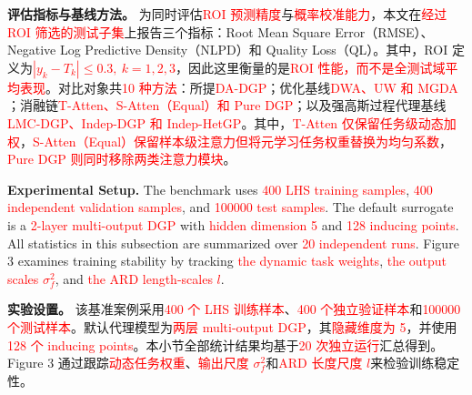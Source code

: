 \documentclass[11pt]{article}
\begin{document}
\textbf{评估指标与基线方法。} 为同时评估\textcolor{red}{ROI 预测精度}与\textcolor{red}{概率校准能力}，本文在\textcolor{red}{经过 ROI 筛选的测试子集}上报告三个指标：Root Mean Square Error（RMSE）、Negative Log Predictive Density（NLPD）和 Quality Loss（QL）。其中，ROI 定义为\textcolor{red}{$|y_k-T_k|\leq 0.3,\ k=1,2,3$}，因此这里衡量的是\textcolor{red}{ROI 性能，而不是全测试域平均表现}。对比对象共\textcolor{red}{10 种方法}：所提\textcolor{red}{DA-DGP}；优化基线\textcolor{red}{DWA、UW 和 MGDA \citep{Liu2019,Kendall2018,Sener2018}}；消融链\textcolor{red}{T-Atten、S-Atten（Equal）和 Pure DGP}；以及强高斯过程代理基线\textcolor{red}{LMC-DGP、Indep-DGP 和 Indep-HetGP}。其中，\textcolor{red}{T-Atten 仅保留任务级动态加权}，\textcolor{red}{S-Atten（Equal）保留样本级注意力但将元学习任务权重替换为均匀系数}，\textcolor{red}{Pure DGP 则同时移除两类注意力模块}。

\textbf{Experimental Setup.} The benchmark uses \textcolor{red}{400 LHS training samples}, \textcolor{red}{400 independent validation samples}, and \textcolor{red}{100000 test samples}. The default surrogate is a \textcolor{red}{2-layer multi-output DGP} with \textcolor{red}{hidden dimension 5} and \textcolor{red}{128 inducing points}. All statistics in this subsection are summarized over \textcolor{red}{20 independent runs}. Figure 3 examines training stability by tracking \textcolor{red}{the dynamic task weights}, \textcolor{red}{the output scales $\sigma_f^2$}, and \textcolor{red}{the ARD length-scales $l$}.

\textbf{实验设置。} 该基准案例采用\textcolor{red}{400 个 LHS 训练样本}、\textcolor{red}{400 个独立验证样本}和\textcolor{red}{100000 个测试样本}。默认代理模型为\textcolor{red}{两层 multi-output DGP}，其\textcolor{red}{隐藏维度为 5}，并使用\textcolor{red}{128 个 inducing points}。本小节全部统计结果均基于\textcolor{red}{20 次独立运行}汇总得到。Figure 3 通过跟踪\textcolor{red}{动态任务权重}、\textcolor{red}{输出尺度 $\sigma_f^2$}和\textcolor{red}{ARD 长度尺度 $l$}来检验训练稳定性。
\end{document}
